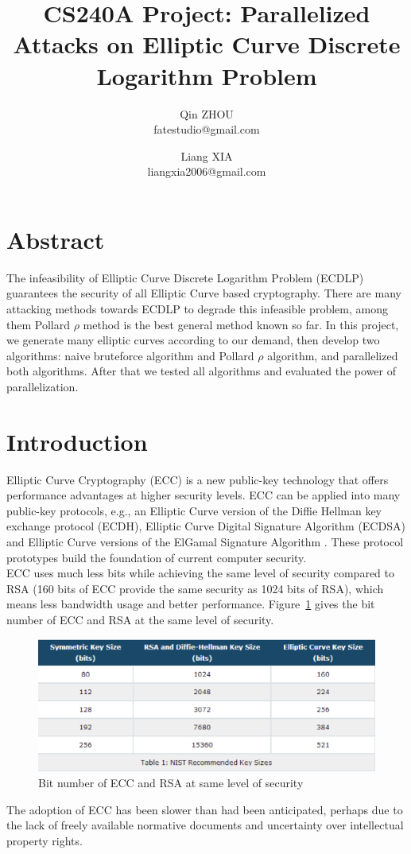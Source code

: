 \documentclass[10pt,a4paper]{article}
\author{Qin ZHOU \\
    fatestudio@gmail.com
    \and
    Liang XIA \\
    liangxia2006@gmail.com
    }
\title{CS240A Project: Parallelized Attacks on Elliptic Curve Discrete
Logarithm Problem}
\begin{document}
\maketitle

\section{Abstract}
\indent The infeasibility of Elliptic Curve Discrete Logarithm Problem (ECDLP) guarantees the security of all Elliptic Curve based cryptography. There are many attacking methods towards ECDLP to degrade this infeasible problem, among them Pollard $\rho$ method is the best general method known so far\cite{CERTICOM}. In this project, we generate many elliptic curves according to our demand, then develop two algorithms: naive bruteforce algorithm and Pollard $\rho$ algorithm, and parallelized both algorithms. After that we tested all algorithms and evaluated the power of parallelization. 

\section{Introduction}
\indent Elliptic Curve Cryptography (ECC) is a new public-key technology that offers performance advantages at higher security levels. ECC can be applied into many public-key protocols, e.g., an Elliptic Curve version of the Diffie Hellman key exchange protocol (ECDH)\cite{DH1976}, Elliptic Curve Digital Signature Algorithm (ECDSA)\cite{ecdsa-cert} and Elliptic Curve
   versions of the ElGamal Signature Algorithm \cite{E1985}. These protocol prototypes build the foundation of current computer security.\\ 
   \indent ECC uses much less bits while achieving the same level of security compared to RSA (160 bits of ECC provide the same security as 1024 bits of RSA), which means less bandwidth usage and better performance. Figure~\ref{table:nist} gives the bit number of ECC and RSA at the same level of security. \\
\begin{figure}[h!]
  \centering
    \includegraphics[scale=0.5]{nist.eps}
  \caption{Bit number of ECC and RSA at same level of security}
  \label{table:nist}
\end{figure}
   \indent The adoption of ECC has been slower than had been anticipated, perhaps due to the lack of freely available normative documents and uncertainty over intellectual property rights\cite{RFC6090}. 
   
\end{document}
